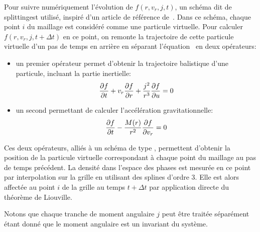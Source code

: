 		Pour suivre numériquement l'évolution de $f(r, v_r, j, t)$, un schéma dit de \og{}splitting\fg est utilisé, inspiré d'un article de référence
		de~\citet{1976JCoPh..22..330C}. Dans ce schéma, chaque point $i$ du maillage est considéré comme une particule virtuelle. Pour calculer
		$f(r, v_r, j, t+\Delta t)$ en ce point, on remonte la trajectoire de cette particule virtuelle d'un pas de temps en arrière en séparant
		l'équation~ en deux opérateurs:
		\begin{itemize}
			\item un premier opérateur permet d'obtenir la trajectoire balistique d'une particule, incluant la partie inertielle:
				\begin{align*}
					\dfrac{\partial f}{\partial t} + v_r\dfrac{\partial f}{\partial r} + \dfrac{j^2}{r^3}\dfrac{\partial f}{\partial u} = 0
				\end{align*}
			\item un second permettant de calculer l'accélération gravitationnelle:
				\begin{align*}
					\dfrac{\partial f}{\partial t} - \dfrac{M(r)}{r^2}\dfrac{\partial f}{\partial v_r} = 0
				\end{align*}
		\end{itemize}
		Ces deux opérateurs, alliés à un schéma de type \og\sm\fg, permettent d'obtenir la position de la particule virtuelle correspondant à chaque
		point du maillage au pas de temps précédent.
		La densité dans l'espace des phases est mesurée en ce point par interpolation sur la grille en utilisant des splines d'ordre 3.
		Elle est alors affectée au point $i$ de la grille au temps $t+\Delta t$ par application directe du théorème de Liouville.

		Notons que chaque tranche de moment angulaire $j$ peut être traitée séparément étant donné que le moment angulaire est un invariant du système.


